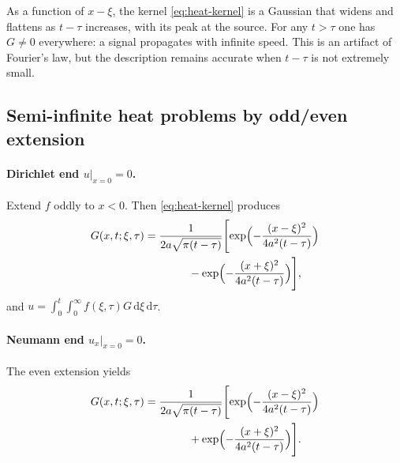 \begin{note}
As a function of $x-\xi$, the kernel \eqref{eq:heat-kernel} is a Gaussian that widens and flattens as $t-\tau$ increases, with its peak at the source. For any $t>\tau$ one has $G\neq0$ everywhere: a signal propagates with infinite speed. This is an artifact of Fourier's law, but the description remains accurate when $t-\tau$ is not extremely small.
\end{note}

\subsection{Semi-infinite heat problems by odd/even extension}

\paragraph{Dirichlet end $u|_{x=0}=0$.}
Extend $f$ oddly to $x<0$. Then \eqref{eq:heat-kernel} produces
\begin{equation}
\begin{aligned}
G(x,t;\xi,\tau)
&=\frac{1}{2a\sqrt{\pi(t-\tau)}}
\Biggl[
\exp\Bigl(-\frac{(x-\xi)^2}{4a^2(t-\tau)}\Bigr)\\
&\qquad\qquad
-\exp\Bigl(-\frac{(x+\xi)^2}{4a^2(t-\tau)}\Bigr)
\Biggr],
\end{aligned}
\end{equation}
and $u=\int_0^t\int_0^{\infty}f(\xi,\tau)G\,\mathrm{d}\xi\,\mathrm{d}\tau$.

\paragraph{Neumann end $u_x|_{x=0}=0$.}
The even extension yields
\begin{equation}
\begin{aligned}
G(x,t;\xi,\tau)
&=\frac{1}{2a\sqrt{\pi(t-\tau)}}
\Biggl[
\exp\Bigl(-\frac{(x-\xi)^2}{4a^2(t-\tau)}\Bigr)\\
&\qquad\qquad
+\exp\Bigl(-\frac{(x+\xi)^2}{4a^2(t-\tau)}\Bigr)
\Biggr].
\end{aligned}
\end{equation}
